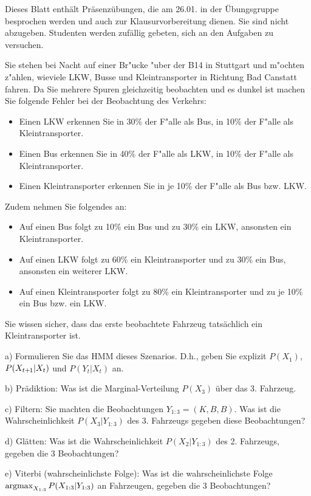 

\renewcommand{\course}{Artificial Intelligence}
\renewcommand{\coursepicture}{course_ai}
\renewcommand{\coursedate}{Winter 2019}
\renewcommand{\exnum}{Exercise 9}

\exercises
{}
\exercisestitle

Dieses Blatt enthält Präsenzübungen, die am 26.01. in der
Übungsgruppe besprochen werden und auch zur Klausurvorbereitung
dienen. Sie sind nicht abzugeben. Studenten werden zufällig gebeten,
sich an den Aufgaben zu versuchen.


Sie stehen bei Nacht auf einer Br"ucke "uber der B14 in Stuttgart und
m"ochten z"ahlen, wieviele LKW, Busse und Kleintransporter in Richtung
Bad Canstatt fahren. Da Sie mehrere Spuren gleichzeitig beobachten und
es dunkel ist machen Sie folgende Fehler bei der Beobachtung des Verkehrs:
\begin{itemize}
\item Einen LKW erkennen Sie in 30\% der F"alle als Bus, in 10\% der
  F"alle als Kleintransporter.
\item Einen Bus erkennen Sie in 40\% der F"alle als LKW, in 10\% der
  F"alle als Kleintransporter.
\item Einen Kleintransporter erkennen Sie in je 10\% der F"alle als
 Bus bzw. LKW.
\end{itemize}
Zudem nehmen Sie folgendes an:
\begin{itemize}
\item Auf einen Bus folgt zu 10\% ein Bus und zu 30\% ein LKW,
  ansonsten ein Kleintransporter.
\item Auf einen LKW folgt zu 60\% ein Kleintransporter und zu 30\% ein
  Bus, ansonsten ein weiterer LKW.
\item Auf einen Kleintransporter folgt zu 80\% ein Kleintransporter
  und zu je 10\% ein Bus bzw. ein LKW.
\end{itemize}
Sie wissen sicher, dass das erste beobachtete Fahrzeug tatsächlich ein
Kleintransporter ist.

a) Formulieren Sie das HMM dieses Szenarios. D.h., geben Sie explizit
$P(X_1)$, $P(X_{t{{\hspace*{-.0pt}\text{\rm +}\hspace*{-.5pt}}1}}|X_t)$ und $P(Y_t|X_t)$ an.

b) Prädiktion: Was ist die Marginal-Verteilung $P(X_3)$ über das
3. Fahrzeug.

c) Filtern: Sie machten die Beobachtungen $Y_{1:3}=(K, B,
B)$. Was ist die Wahrscheinlichkeit $P(X_3|Y_{1:3})$ des 3. Fahrzeugs
gegeben diese Beobachtungen?

d) Glätten: Was ist die Wahrscheinlichkeit $P(X_2|Y_{1:3})$ des 2. Fahrzeugs,
gegeben die 3 Beobachtungen?

e) Viterbi (wahrscheinlichste Folge): Was ist die wahrscheinlichste
Folge $\operatorname*{argmax}_{X_{1:3}} P(X_{1:3}|Y_{1:3})$ an Fahrzeugen, gegeben
  die 3 Beobachtungen?


\exerfoot
